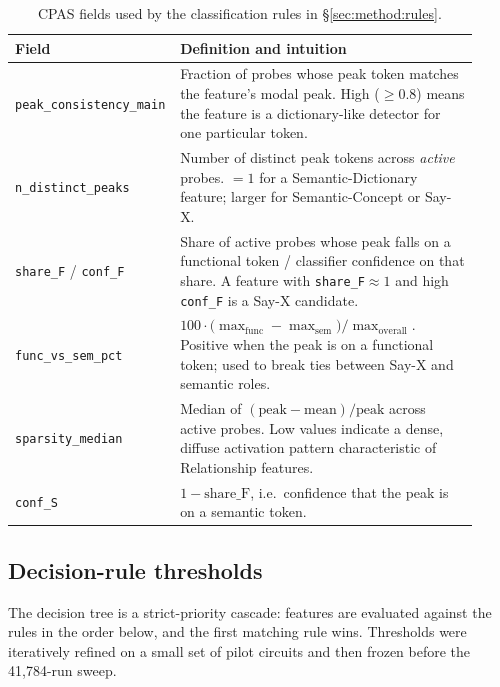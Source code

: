 \begin{table}[h]
\centering\small
\begin{tabular}{p{0.28\linewidth}p{0.64\linewidth}}
\toprule
Field & Definition and intuition \\
\midrule
\texttt{peak\_consistency\_main} & Fraction of probes whose peak token matches the feature's modal peak. High ($\geq 0.8$) means the feature is a dictionary-like detector for one particular token. \\
\texttt{n\_distinct\_peaks} & Number of distinct peak tokens across \emph{active} probes. $=1$ for a Semantic-Dictionary feature; larger for Semantic-Concept or Say-X. \\
\texttt{share\_F} / \texttt{conf\_F} & Share of active probes whose peak falls on a functional token / classifier confidence on that share. A feature with \texttt{share\_F}$\approx 1$ and high \texttt{conf\_F} is a Say-X candidate. \\
\texttt{func\_vs\_sem\_pct} & $100 \cdot \big(\max_{\text{func}} - \max_{\text{sem}}\big) / \max_{\text{overall}}$. Positive when the peak is on a functional token; used to break ties between Say-X and semantic roles. \\
\texttt{sparsity\_median} & Median of $(\mathrm{peak} - \mathrm{mean})/\mathrm{peak}$ across active probes. Low values indicate a dense, diffuse activation pattern characteristic of Relationship features. \\
\texttt{conf\_S} & $1 - \mathrm{share\_F}$, i.e.\ confidence that the peak is on a semantic token. \\
\bottomrule
\end{tabular}
\caption{CPAS fields used by the classification rules in \S\ref{sec:method:rules}.}
\label{tab:cpas-metrics}
\end{table}

\subsection{Decision-rule thresholds}

The decision tree is a strict-priority cascade: features are evaluated against the rules in the order below, and the first matching rule wins. Thresholds were iteratively refined on a small set of pilot circuits and then frozen before the 41{,}784-run sweep.

